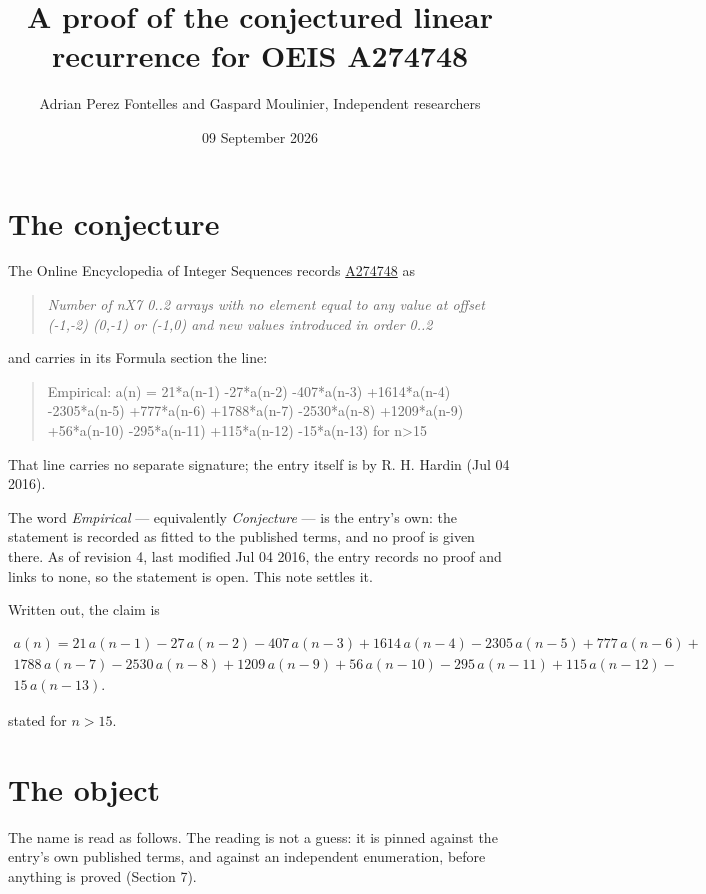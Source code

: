 \documentclass[11pt]{article}
\title{A proof of the conjectured linear recurrence for OEIS A274748}
\author{Adrian Perez Fontelles and Gaspard Moulinier, Independent researchers}
\date{09 September 2026}
\theoremstyle{definition}
\begin{document}
\maketitle
\section{The conjecture}

The Online Encyclopedia of Integer Sequences records \href{https://oeis.org/A274748}{A274748} as

\begin{quote}\itshape Number of nX7 0..2 arrays with no element equal to any value at offset (-1,-2) (0,-1) or (-1,0) and new values introduced in order 0..2\end{quote}

and carries in its Formula section the line:

\begin{quote}\ttfamily Empirical: a(n) = 21*a(n-1) -27*a(n-2) -407*a(n-3) +1614*a(n-4) -2305*a(n-5) +777*a(n-6) +1788*a(n-7) -2530*a(n-8) +1209*a(n-9) +56*a(n-10) -295*a(n-11) +115*a(n-12) -15*a(n-13) for n>15\end{quote}

That line carries no separate signature; the entry itself is by R. H. Hardin (Jul 04 2016).

The word {\itshape Empirical} --- equivalently {\itshape Conjecture} --- is the entry's own: the statement is recorded as fitted to the published terms, and no proof is given there. As of revision 4, last modified Jul 04 2016, the entry records no proof and links to none, so the statement is open. This note settles it.

Written out, the claim is

\begin{multline*} a(n) = 21\,a(n-1) - 27\,a(n-2) - 407\,a(n-3) + 1614\,a(n-4) - 2305\,a(n-5) + 777\,a(n-6) + \\ 1788\,a(n-7) - 2530\,a(n-8) + 1209\,a(n-9) + 56\,a(n-10) - 295\,a(n-11) + 115\,a(n-12) - \\ 15\,a(n-13). \end{multline*}

stated for $n > 15$.

\section{The object}

The name is read as follows. The reading is not a guess: it is pinned against the entry's own published terms, and against an independent enumeration, before anything is proved (Section 7).
\end{document}
